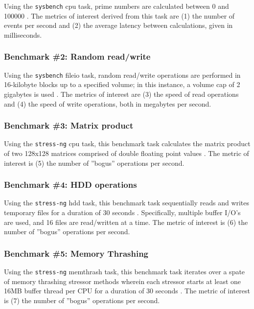\documentclass[sigconf]{acmart}
\begin{document}
Using the {\tt sysbench} cpu task, prime numbers are calculated between 0 and 100000 \cite{sysbench}. The metrics of interest derived from this task are (1) the number of events per second and (2) the average latency between calculations, given in milliseconds.

\subsubsection{Benchmark \#2: Random read/write}

Using the {\tt sysbench} fileio task, random read/write operations are performed in 16-kilobyte blocks up to a specified volume; in this instance, a volume cap of 2 gigabytes is used \cite{sysbench}. The metrics of interest are (3) the speed of read operations and (4) the speed of write operations, both in megabytes per second.

\subsubsection{Benchmark \#3: Matrix product}

Using the {\tt stress-ng} cpu task, this benchmark task calculates the matrix product of two 128x128 matrices comprised of double floating point values \cite{stressng}. The metric of interest is (5) the number of ''bogus'' operations per second.

\subsubsection{Benchmark \#4: HDD operations}

Using the {\tt stress-ng} hdd task, this benchmark task sequentially reads and writes temporary files for a duration of 30 seconds \cite{stressng}. Specifically, multiple buffer I/O's are used, and 16 files are read/written at a time. The metric of interest is (6) the number of ''bogus'' operations per second.

\subsubsection{Benchmark \#5: Memory Thrashing}

Using the {\tt stress-ng} memthrash task, this benchmark task iterates over a spate of memory thrashing stressor methods wherein each stressor starts at least one 16MB buffer thread per CPU for a duration of 30 seconds  \cite{stressng}. The metric of interest is (7) the number of ''bogus'' operations per second.
\end{document}
